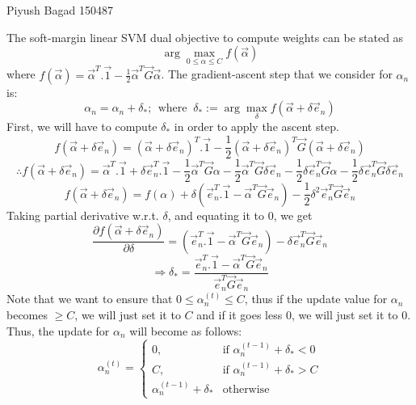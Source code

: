 \documentclass[a4paper,11pt]{article}
\begin{document}
{Piyush Bagad}   %
{150487}	%

\begin{mlsolution}

The soft-margin linear SVM dual objective to compute weights can be stated as
\[
\arg\max_{0 \leq \alpha\leq C} f(\vec{\alpha})
\]
where $ f(\vec{\alpha}) = \vec{\alpha}^{T}.\vec{1} - \frac{1}{2}\vec{\alpha}^{T}\vec{G}\vec{\alpha}  $. The gradient-ascent step that we consider for $\alpha_n$ is:
\[
\alpha_n = \alpha_n + \delta_{*}; \ \ \text{where } \  \delta_{*} := \arg\max_{\delta} f(\vec{\alpha}+\delta\vec{e}_{n})
\]
First, we will have to compute $\delta_{*}$ in order to apply the ascent step.
\[
f(\vec{\alpha}+\delta\vec{e}_n) = (\vec{\alpha}+\delta\vec{e}_{n})^{T}.\vec{1} - \frac{1}{2}(\vec{\alpha}+\delta\vec{e}_{n})^{T}\vec{G}(\vec{\alpha}+\delta\vec{e}_{n})
\]
\[
\therefore 
f(\vec{\alpha}+\delta\vec{e}_n) = \vec{\alpha}^{T}.\vec{1} +\delta\vec{e}^{T}_{n}.\vec{1} - \frac{1}{2}\vec{\alpha}^{T}\vec{G}\alpha     - \frac{1}{2}\vec{\alpha}^{T}\vec{G}\delta\vec{e}_{n} - \frac{1}{2}\delta\vec{e}^{T}_{n}\vec{G}\alpha - \frac{1}{2}\delta\vec{e}^{T}_{n}\vec{G}\delta \vec{e}_{n}
\]
\[
f(\vec{\alpha}+\delta\vec{e}_n) = f(\alpha) +\delta(\vec{e}^{T}_{n}.\vec{1} - \vec{\alpha}^{T}\vec{G}\vec{e}_{n}) - \frac{1}{2}\delta^{2}\vec{e}^{T}_{n}\vec{G} \vec{e}_{n}
\]
Taking partial derivative w.r.t. $\delta$, and equating it to 0, we get
\[
\frac{\partial f(\vec{\alpha}+\delta\vec{e}_n)}{\partial\delta} = (\vec{e}^{T}_{n}.\vec{1} - \vec{\alpha}^{T}\vec{G}\vec{e}_{n}) - \delta\vec{e}^{T}_{n}\vec{G}\vec{e}_{n}
\]
\begin{equation}
\label{delta}
\Rightarrow \boxed{\delta_{*} = \frac{\vec{e}^{T}_{n}.\vec{1} - \vec{\alpha}^{T}\vec{G}\vec{e}_{n}}{\vec{e}^{T}_{n}\vec{G}\vec{e}_{n}}}
\end{equation}
Note that we want to ensure that $0 \leq \alpha^{(t)}_n\leq C$, thus if the update value for $\alpha_n$ becomes $\geq C$, we will just set it to $C$ and if it goes less $0$, we will just set it to $0$. Thus, the update for $\alpha_n$ will become as follows:
\begin{equation}
\label{alpha}
\alpha^{(t)}_n =
\begin{cases}
0, & \text{if } \alpha^{(t-1)}_n+\delta_{*} < 0\\
C, & \text{if } \alpha^{(t-1)}_n+\delta_{*} > C\\
\alpha^{(t-1)}_n+\delta_{*} & \text{otherwise}
\end{cases} 
\end{equation}



\end{mlsolution}
\end{document}
